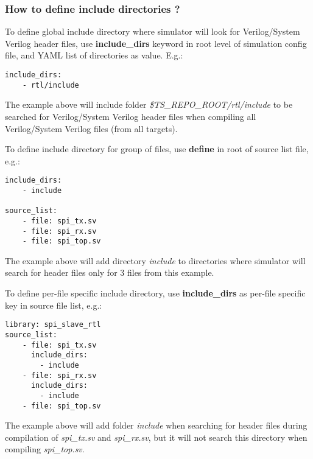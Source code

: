 \documentclass{tropic_design_spec}
\begin{document}


\subsubsection{How to define include directories ?}
\label{sec:how-to-define-include-directories}

To define global include directory where simulator will look for Verilog/System 
Verilog header files, use \textbf{include_dirs} keyword in root level of simulation config
file, and YAML list of directories as value. E.g.:

\begin{lstlisting}
include_dirs:
    - rtl/include
\end{lstlisting}

The example above will include folder \textit{\$TS_REPO_ROOT/rtl/include} to be searched
for Verilog/System Verilog header files when compiling all Verilog/System Verilog files
(from all targets).

To define include directory for group of files, use \textbf{define} in root of source
list file, e.g.:

\begin{lstlisting}
include_dirs:
    - include

source_list:
    - file: spi_tx.sv
    - file: spi_rx.sv
    - file: spi_top.sv
\end{lstlisting}

The example above will add directory \textit{include} to directories where simulator
will search for header files only for 3 files from this example.

To define per-file specific include directory, use \textbf{include_dirs} as per-file
specific key in source file list, e.g.:

\begin{lstlisting}
library: spi_slave_rtl
source_list:
    - file: spi_tx.sv
      include_dirs:
        - include
    - file: spi_rx.sv
      include_dirs:
        - include
    - file: spi_top.sv
\end{lstlisting}

The example above will add folder \textit{include} when searching for header files
during compilation of \textit{spi_tx.sv} and \textit{spi_rx.sv}, but it will not
search this directory when compiling \textit{spi_top.sv}.
\end{document}
